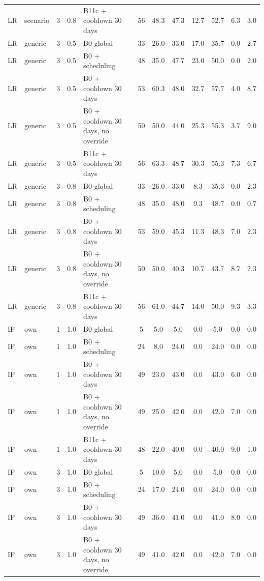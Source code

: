 \documentclass[10pt,onecolumn,letterpaper]{article}
\begin{document}
\begin{longtable}{lllllccccccc}
LR & scenario & 3 & 0.8 & B11c + cooldown 30 days & 56 & 48.3 & 47.3 & 12.7 & 52.7 & 6.3 & 3.0 \\
LR & generic & 3 & 0.5 & B0 global & 33 & 26.0 & 33.0 & 17.0 & 35.7 & 0.0 & 2.7 \\
LR & generic & 3 & 0.5 & B0 + scheduling & 48 & 35.0 & 47.7 & 23.0 & 50.0 & 0.0 & 2.0 \\
LR & generic & 3 & 0.5 & B0 + cooldown 30 days & 53 & 60.3 & 48.0 & 32.7 & 57.7 & 4.0 & 8.7 \\
LR & generic & 3 & 0.5 & B0 + cooldown 30 days, no override & 50 & 50.0 & 44.0 & 25.3 & 55.3 & 3.7 & 9.0 \\
LR & generic & 3 & 0.5 & B11c + cooldown 30 days & 56 & 63.3 & 48.7 & 30.3 & 55.3 & 7.3 & 6.7 \\
LR & generic & 3 & 0.8 & B0 global & 33 & 26.0 & 33.0 & 8.3 & 35.3 & 0.0 & 2.3 \\
LR & generic & 3 & 0.8 & B0 + scheduling & 48 & 35.0 & 48.0 & 9.3 & 48.7 & 0.0 & 0.7 \\
LR & generic & 3 & 0.8 & B0 + cooldown 30 days & 53 & 59.0 & 45.3 & 11.3 & 48.3 & 7.0 & 2.3 \\
LR & generic & 3 & 0.8 & B0 + cooldown 30 days, no override & 50 & 50.0 & 40.3 & 10.7 & 43.7 & 8.7 & 2.3 \\
LR & generic & 3 & 0.8 & B11c + cooldown 30 days & 56 & 61.0 & 44.7 & 14.0 & 50.0 & 9.3 & 3.3 \\
IF & own & 1 & 1.0 & B0 global & 5 & 5.0 & 5.0 & 0.0 & 5.0 & 0.0 & 0.0 \\
IF & own & 1 & 1.0 & B0 + scheduling & 24 & 8.0 & 24.0 & 0.0 & 24.0 & 0.0 & 0.0 \\
IF & own & 1 & 1.0 & B0 + cooldown 30 days & 49 & 23.0 & 43.0 & 0.0 & 43.0 & 6.0 & 0.0 \\
IF & own & 1 & 1.0 & B0 + cooldown 30 days, no override & 49 & 25.0 & 42.0 & 0.0 & 42.0 & 7.0 & 0.0 \\
IF & own & 1 & 1.0 & B11c + cooldown 30 days & 48 & 22.0 & 40.0 & 0.0 & 40.0 & 9.0 & 1.0 \\
IF & own & 3 & 1.0 & B0 global & 5 & 10.0 & 5.0 & 0.0 & 5.0 & 0.0 & 0.0 \\
IF & own & 3 & 1.0 & B0 + scheduling & 24 & 17.0 & 24.0 & 0.0 & 24.0 & 0.0 & 0.0 \\
IF & own & 3 & 1.0 & B0 + cooldown 30 days & 49 & 36.0 & 41.0 & 0.0 & 41.0 & 8.0 & 0.0 \\
IF & own & 3 & 1.0 & B0 + cooldown 30 days, no override & 49 & 41.0 & 42.0 & 0.0 & 42.0 & 7.0 & 0.0 \\

\end{longtable}
\end{document}
